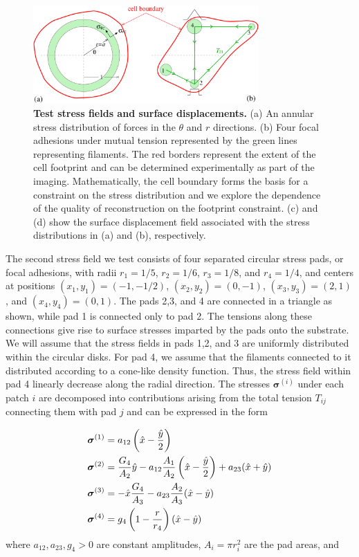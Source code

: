 \documentclass[aps,prl,reprint,twocolumn,groupedaddress,showpacs]{revtex4-1}
\newcommand{\bsigma}{{\boldsymbol\sigma}}
\begin{document}
\begin{figure}[h!]
\begin{center}
%
\includegraphics[width=3.4in]{tests.pdf}
\caption{\textbf{Test stress fields and surface displacements.} (a) An
  annular stress distribution of forces in the $\theta$ and $r$
  directions. (b) Four focal adhesions under mutual tension
  represented by the green lines representing filaments. The red
  borders represent the extent of the cell footprint and can be
  determined experimentally as part of the imaging.  Mathematically,
  the cell boundary forms the basis for a constraint on the stress
  distribution and we explore the dependence of the quality of
  reconstruction on the footprint constraint. (c) and (d) show the
  surface displacement field associated with the stress distributions
  in (a) and (b), respectively.}
\label{TESTS}
\end{center}
\end{figure}
%

The second stress field we test consists of four separated circular
stress pads, or focal adhesions, with radii $r_{1} = 1/5$, $r_{2} =
1/6$, $r_{3} = 1/8$, and $r_{4} = 1/4$, and centers at positions
$(x_{1},y_{1}) = (-1,-1/2)$, $(x_{2},y_{2}) = (0,-1)$, $(x_{3},y_{3}) =
(2,1)$, and $(x_{4},y_{4}) = (0,1)$.  The pads 2,3, and 4 are
connected in a triangle as shown, while pad 1 is connected only to pad
2.  The tensions along these connections give rise to surface stresses
imparted by the pads onto the substrate.  We will assume that the
stress fields in pads 1,2, and 3 are uniformly distributed within the
circular disks. For pad 4, we assume that the filaments connected to
it distributed according to a cone-like density function. Thus, the
stress field within pad 4 linearly decrease along the radial
direction. The stresses $\bsigma^{(i)}$ under each patch $i$ are
decomposed into contributions arising from the total tension $T_{ij}$
connecting them with pad $j$ and can be expressed in the form

\begin{align}
\bsigma^{(1)} & = a_{12}\left(\hat{x} -{\hat{y}\over 2}\right) \label{SIGMA1}\\
\bsigma^{(2)} & = {G_{4}\over A_{2}}\hat{y} - a_{12}{A_{1}\over A_{2}}\left(\hat{x} 
-{\hat{y}\over 2}\right) + a_{23}(\hat{x}+\hat{y}) \label{SIGMA2} \\
\bsigma^{(3)} & = -\hat{x}{G_{4}\over A_{3}} - a_{23}{A_{2}\over A_{3}}(\hat{x}-\hat{y}) 
\label{SIGMA3}\\
\bsigma^{(4)} & = g_{4}\left(1- {r \over r_{4}}\right)(\hat{x}-\hat{y})
\end{align}
%
where $a_{12}, a_{23}, g_{4} >0$ are constant amplitudes, 
$A_{i} = \pi r_{i}^{2}$ are the pad areas, and 
\end{document}
